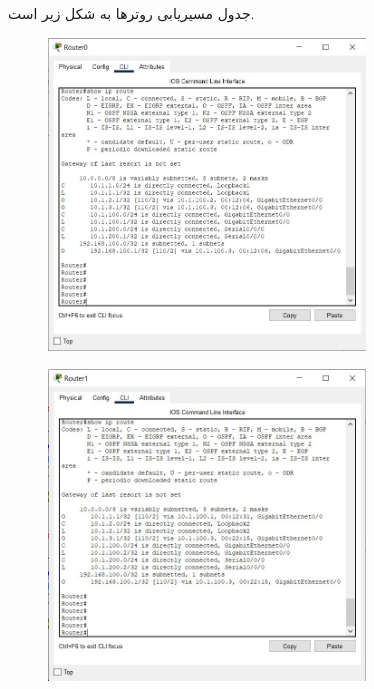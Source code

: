 \documentclass{article}
\begin{document}
\section{}%
جدول مسیریابی روترها به شکل زیر است.
\begin{figure}[H]
    \centering
    \includegraphics[width=0.75\textwidth]{figures/15.jpg}
    \caption{}
    \label{fig:fig1}
\end{figure}
\begin{figure}[H]
    \centering
    \includegraphics[width=0.75\textwidth]{figures/16.jpg}
    \caption{}
    \label{fig:fig1}
\end{figure}
\end{document}
